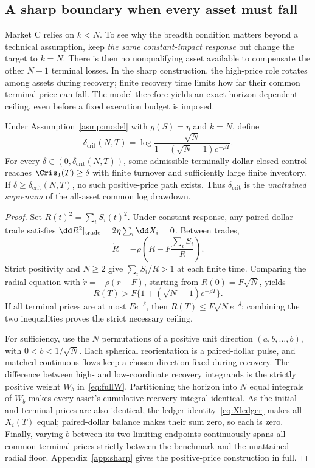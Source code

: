 \documentclass[review,hidelinks,onefignum,onetabnum]{siamonline250211}
\begin{document}
\subsection{A sharp boundary when every asset must fall}\label{sec:allcoverage}
Market C relies on $k<N$. To see why the breadth condition matters beyond a technical assumption, keep \emph{the same constant-impact response} but change the target to $k=N$. There is then no nonqualifying asset available to compensate the other $N-1$ terminal losses. In the sharp construction, the high-price role rotates among assets during recovery; finite recovery time limits how far their common terminal price can fall. The model therefore yields an exact horizon-dependent ceiling, even before a fixed execution budget is imposed.

\begin{theorem}\label{thm:critical}
Under Assumption~\ref{asmp:model} with $g(S)=\eta$ and $k=N$, define
\begin{equation}\label{eq:critical}
\delta_{\mathrm{crit}}(N,T)=
\log\frac{\sqrt N}{1+(\sqrt N-1)e^{-\rho T}}.
\end{equation}
For every $\delta\in(0,\delta_{\mathrm{crit}}(N,T))$, some admissible terminally dollar-closed control reaches $\Cris_1(T)\ge\delta$ with finite turnover and sufficiently large finite inventory. If $\delta\ge\delta_{\mathrm{crit}}(N,T)$, no such positive-price path exists. Thus $\delta_{\mathrm{crit}}$ is the \emph{unattained supremum} of the all-asset common log drawdown.
\end{theorem}
\begin{proof}
Set $R(t)^2=\sum_iS_i(t)^2$. Under constant response,
any paired-dollar trade satisfies
$\dd R^2|_{\rm trade}=2\eta\sum_i\dd X_i=0$.
Between trades,
\[
\dot R=-\rho\left(R-F\frac{\sum_iS_i}{R}\right).
\]
Strict positivity and $N\ge2$ give
$\sum_iS_i/R>1$ at each finite time. Comparing the
radial equation with $\dot r=-\rho(r-F)$, starting from
$R(0)=F\sqrt N$, yields
\[
R(T)>F\{1+(\sqrt N-1)e^{-\rho T}\}.
\]
If all terminal prices are at most $Fe^{-\delta}$,
then $R(T)\le F\sqrt N e^{-\delta}$; combining the
two inequalities proves the strict necessary ceiling.

For sufficiency, use the $N$ permutations of a positive
unit direction $(a,b,\ldots,b)$, with
$0<b<1/\sqrt N$. Each spherical reorientation is a
paired-dollar pulse, and matched continuous flows keep
a chosen direction fixed during recovery. The difference
between high- and low-coordinate recovery integrands is
the strictly positive weight $W_b$ in~\eqref{eq:fullW}.
Partitioning the horizon into $N$ equal integrals of
$W_b$ makes every asset's cumulative recovery integral
identical. As the initial and terminal prices are also
identical, the ledger identity~\eqref{eq:Xledger} makes
all $X_i(T)$ equal; paired-dollar balance makes their
sum zero, so each is zero. Finally, varying $b$ between
its two limiting endpoints continuously spans all common
terminal prices strictly between the benchmark and the
unattained radial floor. Appendix~\ref{app:sharp} gives
the positive-price construction in full.
\end{proof}
\end{document}
